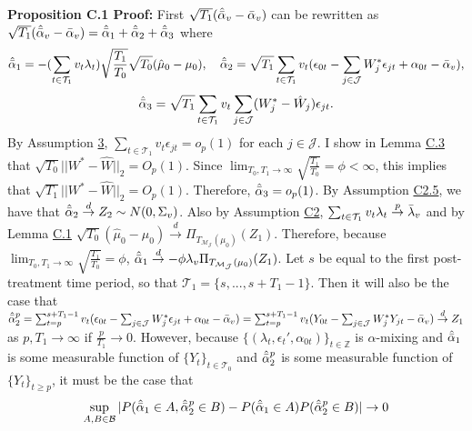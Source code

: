 \documentclass{article}
\begin{document}
\textbf{Proposition C.1 Proof:} First $\sqrt{T_1}(\hat{\Bar{\alpha}}_v - \Bar{\alpha}_v)$ can be rewritten as $\sqrt{T_1}(\hat{\Bar{\alpha}}_v - \Bar{\alpha}_v) = \hat{\Bar{\alpha}}_1 + \hat{\Bar{\alpha}}_2 + \hat{\Bar{\alpha}}_3$ where
\begin{equation*} 
    \hat{\Bar{\alpha}}_1 = - (\sum_{t \in \mathcal{T}_1} v_t \lambda_t)\sqrt{\frac{T_1}{T_0}}\sqrt{T_0}(\hat{\mu}_0 - \mu_0), \quad
    \hat{\Bar{\alpha}}_2 = \sqrt{T_1}\sum_{t \in \mathcal{T}_1}v_t (\epsilon_{0t} - \sum_{j \in \mathcal{J}} W_j^* \epsilon_{jt} + \alpha_{0t} - \Bar{\alpha}_v), 
\end{equation*}
\begin{equation*}
    \hat{\Bar{\alpha}}_3 = \sqrt{T_1}\sum_{t \in \mathcal{T}_1} v_t \sum_{j \in \mathcal{J}} (W_j^* - \hat{W}_j)\epsilon_{jt}.
\end{equation*}
By Assumption \hyperref[A3]{3}, $\sum_{t \in \mathcal{T}_1} v_t \epsilon_{jt} = o_p(1)$ for each $j \in \mathcal{J}$. I show in Lemma \hyperref[LC3]{C.3} that $\sqrt{T_0}||W^* - \hat{W}||_2 = O_p(1)$. Since $\lim_{T_0,T_1 \rightarrow \infty} \sqrt{\frac{T_1}{T_0}} = \phi < \infty$, this implies that  $\sqrt{T_1}||W^* - \hat{W}||_2 = O_p(1)$. Therefore, $\hat{\Bar{\alpha}}_3 = o_p(1)$.
By Assumption \hyperref[AC2]{C2.5}, we have that $\hat{\Bar{\alpha}}_2 \overset{d}{\rightarrow} Z_2 \sim N(0, \Sigma_v)$. Also by Assumption \hyperref[AC2]{C2}, $\sum_{t \in \mathcal{T}_1} v_t \lambda_t \overset{p}{\rightarrow} \Bar{\lambda}_v$ and by Lemma \hyperref[LC1]{C.1} $\sqrt{T_0}(\hat{\mu}_0 -\mu_0) \overset{d}{\rightarrow} \Pi_{T_{\mathcal{M}_{\mathcal{J}}}(\mu_0)} (Z_1)$. Therefore, because  $\lim_{T_0,T_1 \rightarrow \infty} \sqrt{\frac{T_1}{T_0}} = \phi$, $\hat{\Bar{\alpha}}_1 \overset{d}{\rightarrow} -\phi \lambda_v \Pi_{T_{\mathcal{M}_{\mathcal{J}}}(\mu_0)}(Z_1)$. Let $s$ be equal to the first post-treatment time period, so that $\mathcal{T}_1 = \{s,...,s+T_1 - 1\}$. Then it will also be the case that $\hat{\Bar{\alpha}}_2^p = \sum_{t = p}^{s+T_1 -1} v_t (\epsilon_{0t} - \sum_{j \in \mathcal{J}} W_j^* \epsilon_{jt} + \alpha_{0t} - \Bar{\alpha}_v) = \sum_{t = p}^{s+T_1 -1} v_t (Y_{0t} - \sum_{j \in \mathcal{J}} W_j^* Y_{jt} - \Bar{\alpha}_v)  \overset{d}{\rightarrow} Z_1$ as $p, T_1 \rightarrow \infty$ if $\frac{p}{T_1} \rightarrow 0$. However, because $\{(\lambda_t, \epsilon_t' , \alpha_{0t})\}_{t \in \mathbb{Z}}$ is $\alpha$-mixing and $\hat{\Bar{\alpha}}_1$ is some measurable function of $\{Y_t\}_{t \in \mathcal{T}_0}$ and $\hat{\Bar{\alpha}}_2^p$ is some measurable function of $\{Y_t\}_{t \geq p}$, it must be the case that $$\sup_{A ,B \in \mathcal{B}} |P(\hat{\Bar{\alpha}}_1 \in A, \hat{\Bar{\alpha}}_2^p \in B) - P(\hat{\Bar{\alpha}}_1 \in A)P( \hat{\Bar{\alpha}}_2^p \in B)| \rightarrow 0$$
\end{document}
